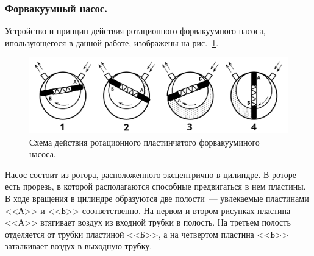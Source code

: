 \documentclass[a4paper,11pt]{article}
\begin{document}
\subsubsection{Форвакуумный насос.}
Устройство и принцип действия ротационного форвакуумного насоса, ипользующегося в данной работе, изображены на рис.~\ref{fig:img2}.\\
\begin{center}
\begin{figure}
  \includegraphics[scale = 0.35]{scheme2.png}
  \caption{Схема действия ротационного пластинчатого форвакууминого насоса.}
  \label{fig:img2}
\end{figure}
\end{center}
Насос состоит из ротора, расположенного эксцентрично в цилиндре. В роторе есть прорезь, в которой располагаются способные предвигаться в нем пластины. В ходе вращения в цилиндре образуются две полости~--- увлекаемые пластинами <<А>> и <<Б>> соответственно. На первом и втором рисунках пластина <<А>> втягивает воздух из входной трубки в полость. На третьем полость отделяется от трубки пластиной <<Б>>, а на четвертом пластина <<Б>> заталкивает воздух в выходную трубку.
\end{document}

